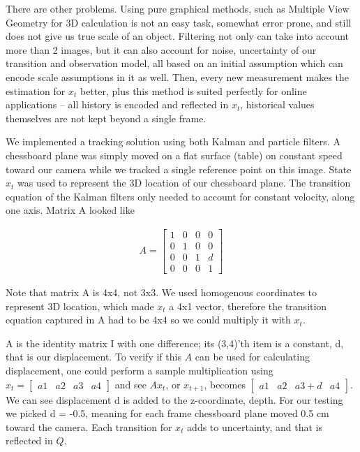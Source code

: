 \documentclass[11pt]{article}
\begin{document}
There are other problems. Using pure graphical methods, such as Multiple View
Geometry for 3D calculation is not an easy task, somewhat error prone, and still
does not give us true scale of an object. Filtering not only can take into
account more than 2 images, but it can also account for noise, uncertainty of
our transition and observation model, all based on an initial assumption which
can encode scale assumptions in it as well. Then, every new measurement makes
the estimation for $x_t$ better, plus this method is suited perfectly for online
applications -- all history is encoded and reflected in $x_t$, historical values
themselves are not kept beyond a single frame.

We implemented a tracking solution using both Kalman and particle filters. A
chessboard plane was simply moved on a flat surface (table) on constant speed
toward our camera while we tracked a single reference point on this image. State
$x_t$ was used to represent the 3D location of our chessboard plane. The
transition equation of the Kalman filters only needed to account for constant
velocity, along one axis. Matrix A looked like

\begin{eqnarray*}
A= \left[
\begin{array}{cccc}
1 & 0 & 0 & 0 \\
0 & 1 & 0 & 0 \\
0 & 0 & 1 & d \\
0 & 0 & 0 & 1
\end{array}
\right]
\end{eqnarray*}

Note that matrix A is 4x4, not 3x3. We used homogenous coordinates to represent
3D location, which made $x_t$ a 4x1 vector, therefore the transition equation
captured in A had to be 4x4 so we could multiply it with $x_t$. 

A is the identity matrix I with one difference; its (3,4)'th item is a constant,
d, that is our displacement. To verify if this $A$ can be used for calculating
displacement, one could perform a sample multiplication using $x_t =
[\begin{array}{cccc}a1 & a2 & a3 & a4 \end{array}]$ and see $Ax_t$, or
$x_{t+1}$, becomes $[\begin{array}{cccc}a1 & a2 & a3+d & a4\end{array}]$. We can
see displacement d is added to the z-coordinate, depth. For our testing we
picked d = -0.5, meaning for each frame chessboard plane moved 0.5 cm toward the
camera. Each transition for $x_t$ adds to uncertainty, and that is reflected in
$Q$.
\end{document}
